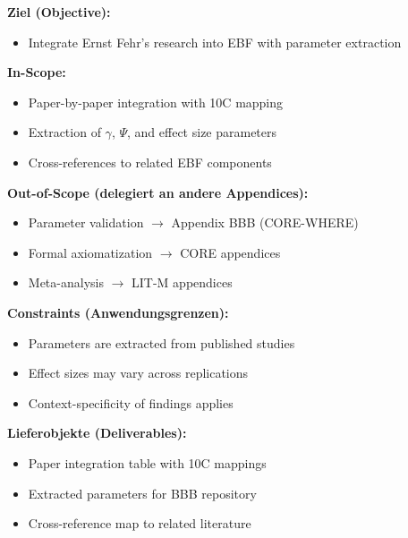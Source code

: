 
\begin{tcolorbox}[
    colback=orange!5!white,
    colframe=orange!75!black,
    title={\textbf{Appendix Scope: Ziel / In-Scope / Out-of-Scope / Constraints}},
    fonttitle=\bfseries
]

\textbf{Ziel (Objective):}
\begin{itemize}[nosep]
    \item Integrate Ernst Fehr's research into EBF with parameter extraction
\end{itemize}

\textbf{In-Scope:}
\begin{itemize}[nosep]
    \item Paper-by-paper integration with 10C mapping
    \item Extraction of $\gamma$, $\Psi$, and effect size parameters
    \item Cross-references to related EBF components
\end{itemize}

\textbf{Out-of-Scope (delegiert an andere Appendices):}
\begin{itemize}[nosep]
    \item Parameter validation $\rightarrow$ Appendix BBB (CORE-WHERE)
    \item Formal axiomatization $\rightarrow$ CORE appendices
    \item Meta-analysis $\rightarrow$ LIT-M appendices
\end{itemize}

\textbf{Constraints (Anwendungsgrenzen):}
\begin{itemize}[nosep]
    \item Parameters are extracted from published studies
    \item Effect sizes may vary across replications
    \item Context-specificity of findings applies
\end{itemize}

\textbf{Lieferobjekte (Deliverables):}
\begin{itemize}[nosep]
    \item Paper integration table with 10C mappings
    \item Extracted parameters for BBB repository
    \item Cross-reference map to related literature
\end{itemize}

\end{tcolorbox}

